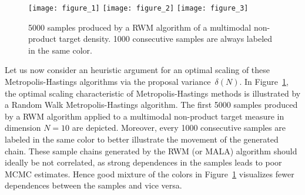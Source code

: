 \begin{figure}%
 \begin{center} 
  \texttt{[image: figure\_1]}
  \vspace*{1mm}
  \label{fig:3DscatterplotRWM-optimal}
  \vspace*{3mm}
  \texttt{[image: figure\_2]}
  \vspace*{1mm}
  \label{fig:3DscatterplotRWM-small}
  \vspace*{3mm}
  \texttt{[image: figure\_3]}
  \vspace*{1mm}
  \label{fig:3DscatterplotRWM-large}
 \end{center}
  \caption{5000 samples produced by a RWM algorithm of a multimodal non-product target density. 1000 consecutive samples are always labeled in the same color.}
  \label{fig:3DscatterplotRWM}
\end{figure}

Let us now consider an heuristic argument for an optimal scaling of these Metropolis-Hastings algorithms via the proposal variance~$\delta(N)$. In Figure~\ref{fig:3DscatterplotRWM}, the optimal scaling characteristic of Metropolis-Hastings methods is illustrated by a Random Walk Metropolis-Hastings algorithm. The first 5000 samples produced by a RWM algorithm applied to a multimodal non-product target measure in dimension $N=10$ are depicted. Moreover, every 1000 consecutive samples are labeled in the same color to better illustrate the movement of the generated chain. These sample chains generated by the RWM (or MALA) algorithm should ideally be not correlated, as strong dependences in the samples leads to poor MCMC estimates. Hence good mixture of the colors in Figure~\ref{fig:3DscatterplotRWM} visualizes fewer dependences between the samples and vice versa. 


